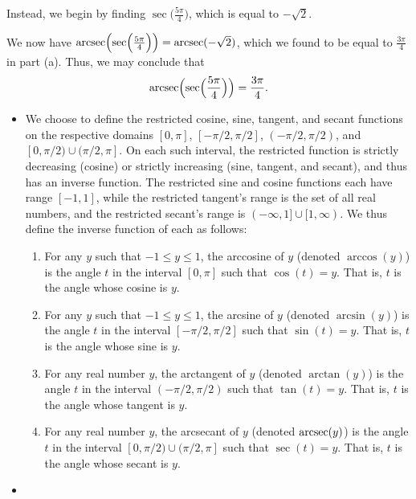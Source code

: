 \documentclass{ximera}
\begin{document}
\begin{example}
\begin{enumerate}
\begin{explanation}
Instead, we begin by finding $\sec\!\Big(\frac{5\pi}{4}\Big)$, which is equal to $-\sqrt{2}$.

We now have  $\operatorname{arcsec}\!\Big(\!\sec\!\Big(\frac{5\pi}{4}\Big)\Big) = \operatorname{arcsec}(-\sqrt{2})$, which we found to be equal to $\frac{3\pi}{4}$ in part (a). Thus, we may conclude that 
%
$$\operatorname{arcsec}\!\Big(\!\sec\!\Big(\frac{5\pi}{4}\Big)\Big) =\frac{3\pi}{4}.$$
\end{explanation}
\end{enumerate}
\end{example}

\begin{summary}
  \begin{itemize}
\item We choose to define the restricted cosine, sine, tangent, and secant functions on the respective domains $[0,\pi]$, $[-\pi/2, \pi/2]$, $(-\pi/2, \pi/2)$, and $[0,\pi/2) \cup (\pi/2, \pi]$.
On each such interval, the restricted function is strictly decreasing (cosine) or strictly increasing (sine,  tangent, and secant), and thus has an inverse function.  The restricted sine and cosine functions each have range $[-1,1]$, while the restricted tangent's range is the set of all real numbers, and the restricted secant's range is $(-\infty,1] \cup [1,\infty)$. 
We thus define the inverse function of each as follows:%
%
\begin{enumerate}[label=\roman*.]
\item
For any $y$ such that $-1 \le y \le 1$, the arccosine of $y$ (denoted $\arccos(y)$) is the angle $t$ in the interval $[0,\pi]$ such that $\cos(t) = y$.  That is, $t$ is the angle whose cosine is $y$.
%
\item%
For any $y$ such that $-1 \le y \le 1$, the arcsine of $y$ (denoted $\arcsin(y)$) is the angle $t$ in the interval $[-\pi/2, \pi/2]$ such that $\sin(t) = y$.  That is, $t$ is the angle whose sine is $y$.
%
\item
For any real number $y$, the arctangent of $y$ (denoted $\arctan(y)$) is the angle $t$ in the interval $(-\pi/2, \pi/2)$ such that $\tan(t) = y$.  That is, $t$ is the angle whose tangent is $y$.
%
\item
For any real number $y$, the arcsecant of $y$ (denoted $\operatorname{arcsec}(y)$) is the angle $t$ in the interval $[0,\pi/2) \cup (\pi/2,\pi]$ such that $\sec(t) = y$.  That is, $t$ is the angle whose secant is $y$.%
\end{enumerate}
%
\item

\end{itemize}
\end{summary}
\end{document}
